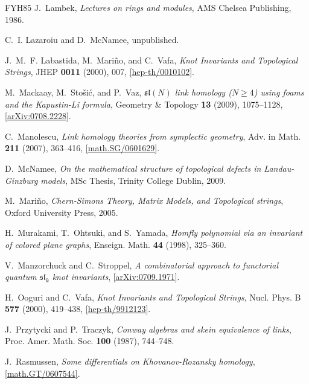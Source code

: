 \documentclass{compositio}
\theoremstyle{definition}
\numberwithin{equation}{section}
\begin{document}
\begin{thebibliography}{FYH{\etalchar{+}}85}
J.~Lambek, \emph{Lectures on rings and modules}, AMS Chelsea Publishing, 1986.

C.~I. Lazaroiu and D.~McNamee, unpublished.

J.~M.~F. Labastida, M.~Mari\~{n}o, and C.~Vafa, \emph{Knot {I}nvariants and
  {T}opological {S}trings}, JHEP \textbf{0011} (2000), 007,
  \href{http://arxiv.org/abs/hep-th/0010102}{[hep-th/0010102]}.

M.~Mackaay, M.~Sto\v{s}i\'{c}, and P.~Vaz, \emph{$\mathfrak{sl}(N)$ link homology ($N\geq 4$) using foams and the Kapustin-Li formula}, Geometry \& Topology \textbf{13} (2009), 1075--1128,
  \href{http://arxiv.org/abs/0708.2228}{[arXiv:0708.2228]}.

C.~Manolescu, \emph{Link homology theories from symplectic geometry}, Adv. in
  Math. \textbf{211} (2007), 363--416,
  \href{http://www.arxiv.org/abs/math.AG/0601629}{[math.SG/0601629]}.

D.~McNamee, \emph{On the mathematical structure of topological defects in
  {L}andau-{G}inzburg models}, MSc Thesis, Trinity College Dublin, 2009.

M.~Mari\~{n}o, \emph{Chern-{S}imons {T}heory, {M}atrix {M}odels, and
  {T}opological s{t}rings}, Oxford University Press, 2005.

H.~Murakami, T.~Ohtsuki, and S.~Yamada, \emph{Homfly polynomial via an
  invariant of colored plane graphs}, Enseign. Math. \textbf{44} (1998),
  325--360.

V.~Manzorchuck and C.~Stroppel, \emph{A combinatorial approach to functorial
  quantum {$\mathfrak{sl}_k$} knot invariants},
  \href{http://arxiv.org/abs/0709.1971}{[arXiv:0709.1971]}.

H.~Ooguri and C.~Vafa, \emph{Knot {I}nvariants and {T}opological {S}trings},
  Nucl. Phys. B \textbf{577} (2000), 419--438,
  \href{http://arxiv.org/abs/hep-th/9912123}{[hep-th/9912123]}.

J.~Przytycki and P.~Traczyk, \emph{Conway algebras and skein equivalence of
  links}, Proc. Amer. Math. Soc. \textbf{100} (1987), 744--748.

J.~Rasmussen, \emph{Some differentials on {K}hovanov-{R}ozansky homology},
  \href{http://arxiv.org/abs/math/0607544}{[math.GT/0607544]}.


\end{thebibliography}
\end{document}
